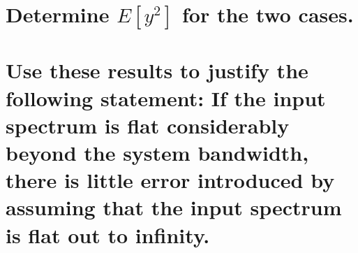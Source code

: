 \documentclass[12pt,letterpaper, onecolumn]{exam}
\begin{document}
\begin{questions}
\begin{parts}
        \solution{}

        \part{Determine $E[y^2]$ for the two cases.}

        \solution{}

        \part{Use these results to justify the following statement:
            If the input spectrum is flat considerably beyond the system bandwidth, there is little error introduced by assuming that the input spectrum is flat out to infinity.
        }

        \solution{}

    \end{parts}

\end{questions}
\end{document}
